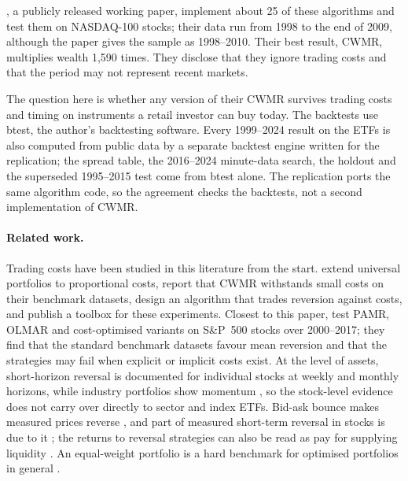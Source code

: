 \documentclass[11pt]{article}
\begin{document}
\citet{lahanis2025}, a publicly released working paper, implement about 25 of these algorithms
and test them on NASDAQ-100 stocks; their data run from 1998 to the end of 2009, although the
paper gives the sample as 1998--2010. Their best result, CWMR, multiplies wealth 1,590 times. They disclose that
they ignore trading costs and that the period may not represent recent markets.

The question here is whether any version of their CWMR survives trading costs and timing on
instruments a retail investor can buy today. The backtests use btest, the author's backtesting
software. Every 1999--2024 result on the ETFs is also computed from public data by a separate
backtest engine written for the replication; the spread table, the 2016--2024 minute-data
search, the holdout and the superseded 1995--2015 test come from btest alone. The replication
ports the same algorithm code, so the agreement checks the backtests, not a second
implementation of CWMR.

\paragraph{Related work.} Trading costs have been studied in this literature from the start.
\citet{blum1999} extend universal portfolios to proportional costs, \citet{li2011cwmr} report
that CWMR withstands small costs on their benchmark datasets, \citet{li2018tco} design an
algorithm that trades reversion against costs, and \citet{li2016olps} publish a toolbox for
these experiments. Closest to this paper, \citet{moon2019} test PAMR, OLMAR and cost-optimised
variants on S\&P~500 stocks over 2000--2017; they find that the standard benchmark datasets
favour mean reversion and that the strategies may fail when explicit or implicit costs exist.
At the level of assets, short-horizon reversal is documented for individual stocks at weekly
\citep{lehmann1990} and monthly \citep{jegadeesh1990} horizons, while industry portfolios show
momentum \citep{moskowitz1999}, so the stock-level evidence does not carry over directly to
sector and index ETFs. Bid-ask bounce makes measured prices reverse \citep{roll1984}, and part
of measured short-term reversal in stocks is due to it \citep{kaul1990,conrad1997}; the returns
to reversal strategies can also be read as pay for supplying liquidity \citep{nagel2012}. An
equal-weight portfolio is a hard benchmark for optimised portfolios in general
\citep{demiguel2009}.
\end{document}
